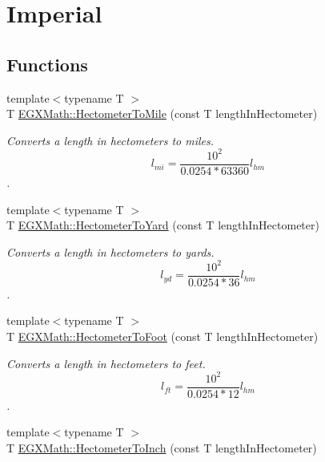 \hypertarget{group___e_g_x_math-_conversions-_length_conversions-_s_i-_hectometer-_imperial}{}\section{Imperial}
\label{group___e_g_x_math-_conversions-_length_conversions-_s_i-_hectometer-_imperial}
\subsection*{Functions}
\begin{DoxyCompactItemize}
\item 
{\footnotesize template$<$typename T $>$ }\\T \mbox{\hyperlink{group___e_g_x_math-_conversions-_length_conversions-_s_i-_hectometer-_imperial_gabb3930dfb3335dc53303ec8ce9145d71}{E\+G\+X\+Math\+::\+Hectometer\+To\+Mile}} (const T length\+In\+Hectometer)
\begin{DoxyCompactList}\small\item\em Converts a length in hectometers to miles. \[ l_{mi}=\frac{10^{2}}{0.0254 * 63360} l_{hm} \]. \end{DoxyCompactList}\item 
{\footnotesize template$<$typename T $>$ }\\T \mbox{\hyperlink{group___e_g_x_math-_conversions-_length_conversions-_s_i-_hectometer-_imperial_ga84866f087daa74cdd00348f42462d13c}{E\+G\+X\+Math\+::\+Hectometer\+To\+Yard}} (const T length\+In\+Hectometer)
\begin{DoxyCompactList}\small\item\em Converts a length in hectometers to yards. \[ l_{yd}= \frac{10^{2}}{0.0254 * 36} l_{hm} \]. \end{DoxyCompactList}\item 
{\footnotesize template$<$typename T $>$ }\\T \mbox{\hyperlink{group___e_g_x_math-_conversions-_length_conversions-_s_i-_hectometer-_imperial_ga8b57e6e5bef662cc96b8b7dde68659a6}{E\+G\+X\+Math\+::\+Hectometer\+To\+Foot}} (const T length\+In\+Hectometer)
\begin{DoxyCompactList}\small\item\em Converts a length in hectometers to feet. \[ l_{ft}= \frac{10^{2}}{0.0254 * 12} l_{hm} \]. \end{DoxyCompactList}\item 
{\footnotesize template$<$typename T $>$ }\\T \mbox{\hyperlink{group___e_g_x_math-_conversions-_length_conversions-_s_i-_hectometer-_imperial_ga21fd4a7228c229b0b229fd0fab224998}{E\+G\+X\+Math\+::\+Hectometer\+To\+Inch}} (const T length\+In\+Hectometer)

\end{DoxyCompactItemize}
